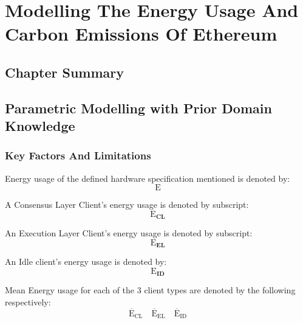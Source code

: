 \chapter{Modelling The Energy Usage And Carbon Emissions Of Ethereum}

\section{Chapter Summary}


\section{Parametric Modelling with Prior Domain Knowledge}

\subsection {Key Factors And Limitations}


Energy usage of the defined hardware specification mentioned is denoted by:
\begin{equation*}
    \boldsymbol{\mathrm{E}}
\end{equation*} 

A Consensus Layer Client's energy usage is denoted by subscript:
\begin{equation*}
    \boldsymbol{\mathrm{E}_{CL}}
\end{equation*}

An Execution Layer Client's energy usage is denoted by subscript:
\begin{equation*}
    \boldsymbol{\mathrm{E}_{EL}}
\end{equation*}
 
 An Idle client's energy usage is denoted by: \begin{equation*}
    \boldsymbol{\mathrm{E}_{ID}}
\end{equation*} 

Mean Energy usage for each of the 3 client types are denoted by the following respectively: 
\begin{equation*}
  \boldsymbol{\mathrm{{\overline{E}}_{CL}}}\quad      \boldsymbol{\mathrm{{\overline{E}}_{EL}}}\quad  \boldsymbol{\mathrm{{\overline{E}}_{ID}}}   
\end{equation*}

